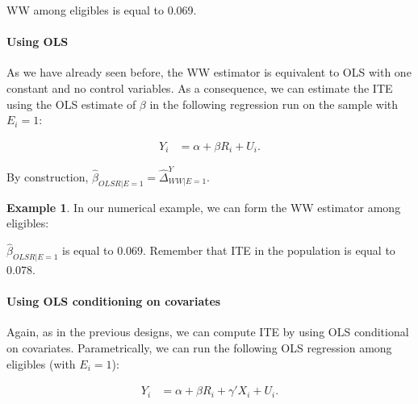 \documentclass[
]{book}
\newenvironment{Shaded}{\begin{snugshade}}{\end{snugshade}}
\newcommand{\DecValTok}[1]{\textcolor[rgb]{0.00,0.00,0.81}{#1}}
\newcommand{\FunctionTok}[1]{\textcolor[rgb]{0.00,0.00,0.00}{#1}}
\newcommand{\NormalTok}[1]{#1}
\newcommand{\OtherTok}[1]{\textcolor[rgb]{0.56,0.35,0.01}{#1}}
\newcommand{\SpecialCharTok}[1]{\textcolor[rgb]{0.00,0.00,0.00}{#1}}
\theoremstyle{definition}
\theoremstyle{definition}
\newtheorem{example}{Example}[chapter]
\theoremstyle{definition}
\theoremstyle{definition}
\theoremstyle{remark}
\begin{document}
WW among eligibles is equal to 0.069.

\hypertarget{using-ols-2}{%
\paragraph{Using OLS}\label{using-ols-2}}

As we have already seen before, the WW estimator is equivalent to OLS with one constant and no control variables.
As a consequence, we can estimate the ITE using the OLS estimate of \(\beta\) in the following regression run on the sample with \(E_i=1\):

\begin{align*}
  Y_i & = \alpha + \beta R_i + U_i.
\end{align*}

By construction, \(\hat{\beta}_{OLSR|E=1}=\hat{\Delta}^Y_{WW|E=1}\).

\begin{example}
\protect\hypertarget{exm:unnamed-chunk-95}{}{\label{exm:unnamed-chunk-95} }In our numerical example, we can form the WW estimator among eligibles:
\end{example}

\begin{Shaded}
\end{Shaded}

\(\hat{\beta}_{OLSR|E=1}\) is equal to 0.069.
Remember that ITE in the population is equal to 0.078.

\hypertarget{using-ols-conditioning-on-covariates-2}{%
\paragraph{Using OLS conditioning on covariates}\label{using-ols-conditioning-on-covariates-2}}

Again, as in the previous designs, we can compute ITE by using OLS conditional on covariates.
Parametrically, we can run the following OLS regression among eligibles (with \(E_i=1\)):

\begin{align*}
    Y_i &  = \alpha +  \beta R_i + \gamma' X_i + U_i.
  \end{align*}
\end{document}
